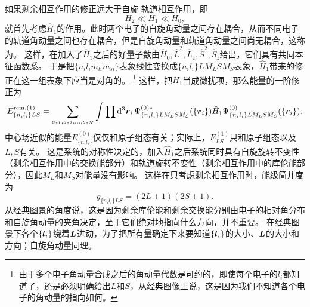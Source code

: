 如果剩余相互作用的修正远大于自旋-轨道相互作用，即
\begin{equation}
    H_2 \ll H_1 \ll H_0,
\end{equation}
就首先考虑$\hat{H}_1$的作用。此时两个电子的自旋角动量之间存在耦合，从而不同电子的轨道角动量之间也存在耦合，但是自旋角动量和轨道角动量之间尚无耦合，这称为。
这样，在加入了$\hat{H}_1$之后的好量子数由$\hat{H}_0, \hat{L}^2, \hat{L}_z, \hat{S}^2, \hat{S}_z$给出，它们具有共同本征函数系。
于是把$\{n_i l_i m_{li} m_{si}\}$表象线性变换成$\{n_i l_i\} L M_L S M_S$表象，$\hat{H}_1$带来的修正在这一组表象下应当是对角的。%
\footnote{由于多个电子角动量合成之后的角动量代数是可约的，即使每个电子的$l_i$都知道了，还是必须明确给出$L$和$S$，从经典图像上说，这是因为我们不知道各个电子的角动量的指向如何。}%
这样，把$\hat{H}_1$当成微扰项，那么能量的一阶修正为
\begin{equation}
    E^{\text{rem}, (1)}_{\{n_i l_i\} LS} = \sum_{s_{z1}, s_{z2}, \ldots, s_{zN}} \int \prod \dd[3]{\vb*{r}_i} \Psi^{(0) *}_{\{n_i l_i\} L M_L S M_S}(\{\vb*{r}_i\}) \hat{H}_1 \Psi^{(0)}_{\{n_i l_i\} L M_L S M_S}(\{\vb*{r}_i\}).
    \label{eq:ls-1}
\end{equation}
中心场近似的能量$E^{(0)}_{\{n_i l_i\}}$仅仅和原子组态有关；实际上，$E^{(1)}_{LS}$只和原子组态以及$L,S$有关。
这是系统的对称性决定的，加入$\hat{H}_1$之后系统同时具有自旋旋转不变性（剩余相互作用中的交换能部分）和轨道旋转不变性（剩余相互作用中的库伦能部分），因此$M_L$和$M_S$对能量没有影响。
这样在只考虑剩余相互作用时，能级简并度为
\begin{equation}
    g_{\{n_i l_i\}LS} = (2L+1)(2S+1).
\end{equation}
从经典图景的角度说，这是因为剩余库伦能和剩余交换能分别由电子的相对角分布和自旋角动量的夹角决定，至于它们绝对地指向什么方向，并不重要。
在经典图景下各个$\{\vb*{l}_i\}$绕着$\vb*{L}$进动，为了把所有量确定下来要知道$\{\vb*{l}_i\}$的大小、$\vb*{L}$的大小和方向；自旋角动量同理。

